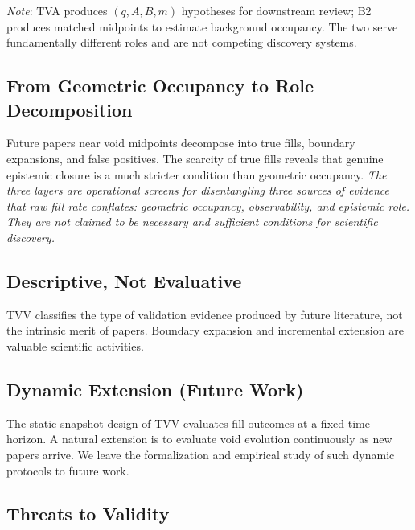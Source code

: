 \documentclass[11pt,twocolumn]{article}
\newcommand{\tvv}{\textsf{TVV}}
\begin{document}
\noindent\emph{Note}: TVA produces $(q,A,B,m)$ hypotheses for downstream review;
B2 produces matched midpoints to estimate background occupancy. The two serve
fundamentally different roles and are not competing discovery systems.

\subsection{From Geometric Occupancy to Role Decomposition}

Future papers near void midpoints decompose into true fills, boundary expansions, and
false positives. The scarcity of true fills reveals that genuine epistemic closure is
a much stricter condition than geometric occupancy.
\emph{The three layers are operational screens for disentangling three sources of
evidence that raw fill rate conflates: geometric occupancy, observability, and
epistemic role. They are not claimed to be necessary and sufficient conditions
for scientific discovery.}

\subsection{Descriptive, Not Evaluative}

\tvv{} classifies the type of validation evidence produced by future literature, not
the intrinsic merit of papers. Boundary expansion and incremental extension are
valuable scientific activities.

\subsection{Dynamic Extension (Future Work)}

The static-snapshot design of \tvv{} evaluates fill outcomes at a fixed
time horizon. A natural extension is to evaluate void evolution
continuously as new papers arrive. We leave the formalization and
empirical study of such dynamic protocols to future work.

\subsection{Threats to Validity}
\end{document}
